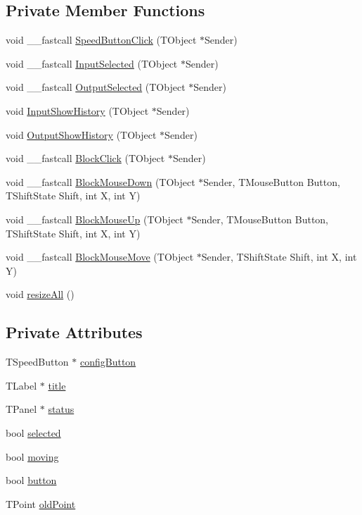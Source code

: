 \subsection*{Private Member Functions}
\begin{CompactItemize}
\item 
void \_\-\_\-fastcall \hyperlink{classVisualBlock_12b120084c71ac8e29f8b527401e9bb6}{SpeedButtonClick} (TObject $\ast$Sender)
\item 
void \_\-\_\-fastcall \hyperlink{classVisualBlock_a6eb1b3dcbbbb50d21bfb263935c6780}{InputSelected} (TObject $\ast$Sender)
\item 
void \_\-\_\-fastcall \hyperlink{classVisualBlock_79906715a0a58e622284b4be0402d13d}{OutputSelected} (TObject $\ast$Sender)
\item 
void \hyperlink{classVisualBlock_0dd05c49185b9c4ed3c2067c2887207c}{InputShowHistory} (TObject $\ast$Sender)
\item 
void \hyperlink{classVisualBlock_a06f4f819f1ffb8210552be1b2588241}{OutputShowHistory} (TObject $\ast$Sender)
\item 
void \_\-\_\-fastcall \hyperlink{classVisualBlock_92cda5ed352c37bdf35821d733a9eec0}{BlockClick} (TObject $\ast$Sender)
\item 
void \_\-\_\-fastcall \hyperlink{classVisualBlock_4105b606e41f9682f565a982e5ba78ac}{BlockMouseDown} (TObject $\ast$Sender, TMouseButton Button, TShiftState Shift, int X, int Y)
\item 
void \_\-\_\-fastcall \hyperlink{classVisualBlock_e4aaf7841bf53a143a3c83df422dc387}{BlockMouseUp} (TObject $\ast$Sender, TMouseButton Button, TShiftState Shift, int X, int Y)
\item 
void \_\-\_\-fastcall \hyperlink{classVisualBlock_f88b17e4ee367aa1bd52e0ba403e3ec9}{BlockMouseMove} (TObject $\ast$Sender, TShiftState Shift, int X, int Y)
\item 
void \hyperlink{classVisualBlock_120c84328c3017aec8fc669d156883a6}{resizeAll} ()
\end{CompactItemize}
\subsection*{Private Attributes}
\begin{CompactItemize}
\item 
TSpeedButton $\ast$ \hyperlink{classVisualBlock_12c5a7d37bad2fe96c1e681193e46692}{configButton}
\item 
TLabel $\ast$ \hyperlink{classVisualBlock_fb8a08d0bdaabd2f2c9331c73b327e94}{title}
\item 
TPanel $\ast$ \hyperlink{classVisualBlock_848de7730beb758d3c427f99ab78deaf}{status}
\item 
bool \hyperlink{classVisualBlock_6d94e21639a7e021c92a0fd31e859487}{selected}
\item 
bool \hyperlink{classVisualBlock_e8a5a106bf510e7029c0f453e6ecd999}{moving}
\item 
bool \hyperlink{classVisualBlock_b3035554398e30e608325b6c640ace2d}{button}
\item 
TPoint \hyperlink{classVisualBlock_43953361a9b50884f92ed3e9ee90c5b2}{oldPoint}
\end{CompactItemize}


